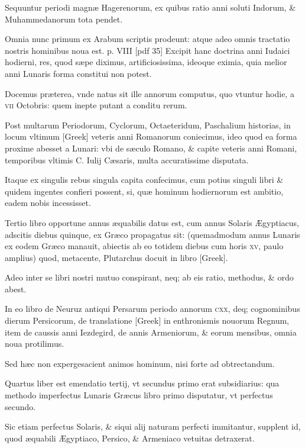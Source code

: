 \begin{parnumbers}
Sequuntur periodi magnæ Hagerenorum, ex quibus ratio anni soluti Indorum, \& Muhammedanorum tota pendet.

Omnia nunc primum ex Arabum scriptis prodeunt: atque adeo omnis tractatio nostris hominibus noua est.
\clearpage
p. VIII [pdf 35]
Excipit hanc doctrina anni Iudaici hodierni, res, quod sæpe diximus, artificiosissima, ideoque eximia, quia melior
anni Lunaris forma constitui non potest.

Docemus præterea, vnde natus sit ille annorum computus, quo vtuntur hodie, a \textsc{vii} Octobris: quem inepte putant a conditu rerum.

Post multarum Periodorum, Cyclorum, Octaeteridum, Paschalium historias, in locum vltimum \textgreek{[Greek]} veteris anni Romanorum coniecimus, ideo quod ea forma proxime abesset a Lunari: vbi de sæculo Romano, \& capite veteris anni Romani, temporibus vltimis C. Iulij Cæsaris, multa accuratissime disputata.

Itaque ex singulis rebus singula capita confecimus, cum potius singuli libri \& quidem ingentes confieri possent, si, quæ hominum hodiernorum est ambitio, eadem nobis incessisset.

Tertio libro opportune annus æquabilis datus est, cum annus Solaris Ægyptiacus, adscitis diebus quinque, ex Græco propagatus sit: (quemadmodum annus Lunaris ex eodem Græco manauit, abiectis ab eo totidem diebus cum horis \textsc{xv}, paulo amplius) quod, metacente, Plutarchus docuit in libro \textgreek{[Greek]}.

Adeo inter se libri nostri mutuo conspirant, neq; ab eis ratio, methodus, \& ordo abest.

In eo libro de Neuruz antiqui Persarum periodo annorum \textsc{cxx}, deq; cognominibus dierum Persicorum, de translatione \textgreek{[Greek]} in enthronismis nouorum Regnum, item de caussis anni Iezdegird, de annis Armeniorum, \& eorum mensibus, omnia noua protilimus. 

Sed hæc non expergesacient animos hominum, nisi forte ad obtrectandum.

Quartus liber est emendatio tertij, vt secundus primo erat subsidiarius: qua methodo imperfectus Lunaris Græcus libro primo disputatur, vt perfectus secundo.

Sic etiam perfectus Solaris, \& siqui alij naturam perfecti immitantur, supplent id, quod æquabili Ægyptiaco, Persico, \& Armeniaco vetuitas detraxerat.


\end{parnumbers}
